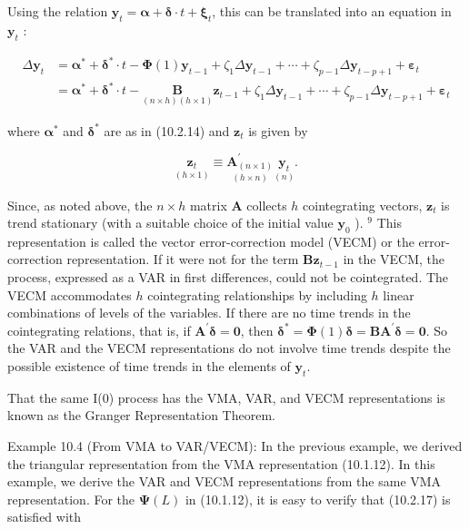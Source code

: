 \documentclass[10pt]{article}
\begin{document}
Using the relation $\mathbf{y}_{t}=\boldsymbol{\alpha}+\boldsymbol{\delta} \cdot t+\boldsymbol{\xi}_{t}$, this can be translated into an equation in $\mathbf{y}_{t}$ :


\begin{align*}
\Delta \mathbf{y}_{t} & =\boldsymbol{\alpha}^{*}+\boldsymbol{\delta}^{*} \cdot t-\boldsymbol{\Phi}(1) \mathbf{y}_{t-1}+\zeta_{1} \Delta \mathbf{y}_{t-1}+\cdots+\zeta_{p-1} \Delta \mathbf{y}_{t-p+1}+\boldsymbol{\varepsilon}_{t}  \tag{10.2.26}\\
& =\boldsymbol{\alpha}^{*}+\boldsymbol{\delta}^{*} \cdot t-\underset{(n \times h)(h \times 1)}{\mathbf{B}} \mathbf{z}_{t-1}+\zeta_{1} \Delta \mathbf{y}_{t-1}+\cdots+\zeta_{p-1} \Delta \mathbf{y}_{t-p+1}+\boldsymbol{\varepsilon}_{t} \tag{10.2.27}
\end{align*}


where $\boldsymbol{\alpha}^{*}$ and $\boldsymbol{\delta}^{*}$ are as in (10.2.14) and $\mathbf{z}_{t}$ is given by


\begin{equation*}
\underset{(h \times 1)}{\mathbf{z}_{t}} \equiv \underset{(h \times n)}{\mathbf{A}_{(n \times 1)}^{\prime}} \underset{(n)}{\mathbf{y}_{t}} . \tag{10.2.28}
\end{equation*}


Since, as noted above, the $n \times h$ matrix $\mathbf{A}$ collects $h$ cointegrating vectors, $\mathbf{z}_{t}$ is trend stationary (with a suitable choice of the initial value $\mathbf{y}_{0}$ ). ${ }^{9}$ This representation is called the vector error-correction model (VECM) or the error-correction representation. If it were not for the term $\mathbf{B} \mathbf{z}_{t-1}$ in the VECM, the process, expressed as a VAR in first differences, could not be cointegrated. The VECM accommodates $h$ cointegrating relationships by including $h$ linear combinations of levels of the variables. If there are no time trends in the cointegrating relations, that is, if $\mathbf{A}^{\prime} \boldsymbol{\delta}=\mathbf{0}$, then $\boldsymbol{\delta}^{*}=\boldsymbol{\Phi}(1) \boldsymbol{\delta}=\mathbf{B A}^{\prime} \boldsymbol{\delta}=\mathbf{0}$. So the VAR and the VECM representations do not involve time trends despite the possible existence of time trends in the elements of $\mathbf{y}_{t}$.

That the same I(0) process has the VMA, VAR, and VECM representations is known as the Granger Representation Theorem.

Example 10.4 (From VMA to VAR/VECM): In the previous example, we derived the triangular representation from the VMA representation (10.1.12). In this example, we derive the VAR and VECM representations from the same VMA representation. For the $\boldsymbol{\Psi}(L)$ in (10.1.12), it is easy to verify that (10.2.17) is satisfied with
\end{document}

